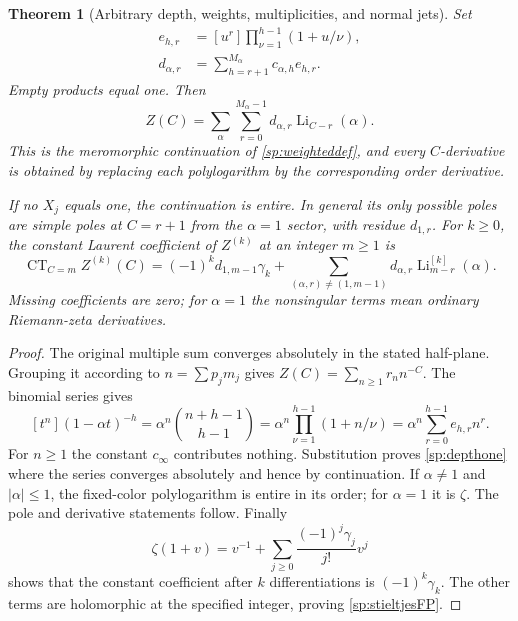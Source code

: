 \documentclass[11pt,a4paper]{article}
\newtheorem{theorem}{Theorem}[section]
\theoremstyle{definition}
\theoremstyle{remark}
\numberwithin{equation}{section}
\begin{document}
\begin{theorem}[Arbitrary depth, weights, multiplicities, and normal jets]
\label{sp:rationaltheorem}
Set
\begin{align}
 e_{h,r}
  &=[u^r]\prod_{\nu=1}^{h-1}(1+u/\nu),\label{sp:eh}\\
 d_{\alpha,r}
  &=\sum_{h=r+1}^{M_\alpha}c_{\alpha,h}e_{h,r}.
 \label{sp:dcoeff}
\end{align}
Empty products equal one.  Then
\begin{equation}\label{sp:depthone}
 Z(C)=\sum_\alpha\sum_{r=0}^{M_\alpha-1}
               d_{\alpha,r}\operatorname{Li}_{C-r}(\alpha).
\end{equation}
This is the meromorphic continuation of \eqref{sp:weighteddef}, and
every $C$-derivative is obtained by replacing each polylogarithm by
the corresponding order derivative.

If no $X_j$ equals one, the continuation is entire.  In general its
only possible poles are simple poles at $C=r+1$ from the $\alpha=1$
sector, with residue $d_{1,r}$.  For $k\geq0$, the constant Laurent
coefficient of $Z^{(k)}$ at an integer $m\geq1$ is
\begin{equation}\label{sp:stieltjesFP}
 \operatorname{CT}_{C=m} Z^{(k)}(C)
 =(-1)^k d_{1,m-1}\gamma_k
   +\sum_{(\alpha,r)\ne(1,m-1)}
      d_{\alpha,r}\operatorname{Li}_{m-r}^{[k]}(\alpha).
\end{equation}
Missing coefficients are zero; for $\alpha=1$ the nonsingular terms
mean ordinary Riemann-zeta derivatives.
\end{theorem}
\begin{proof}
The original multiple sum converges absolutely in the stated
half-plane.  Grouping it according to $n=\sum p_jm_j$ gives
$Z(C)=\sum_{n\geq1}r_n n^{-C}$.  The binomial series gives
\[
 [t^n](1-\alpha t)^{-h}
 =\alpha^n\binom{n+h-1}{h-1}
 =\alpha^n\prod_{\nu=1}^{h-1}(1+n/\nu)
 =\alpha^n\sum_{r=0}^{h-1}e_{h,r}n^r.
\]
For $n\geq1$ the constant $c_\infty$ contributes nothing.  Substitution
proves \eqref{sp:depthone} where the series converges absolutely and hence
by continuation.  If $\alpha\ne1$ and $|\alpha|\leq1$, the fixed-color
polylogarithm is entire in its order; for $\alpha=1$ it is $\zeta$.
The pole and derivative statements follow.  Finally
\[
 \zeta(1+v)=v^{-1}+
       \sum_{j\geq0}\frac{(-1)^j\gamma_j}{j!}v^j
\]
shows that the constant coefficient after $k$ differentiations is
$(-1)^k\gamma_k$.  The other terms are holomorphic at the specified
integer, proving \eqref{sp:stieltjesFP}.
\end{proof}
\end{document}
